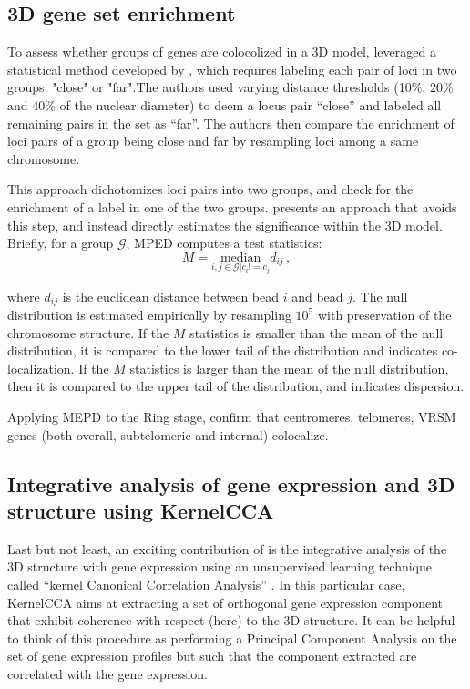\documentclass[2columns]{article}
\begin{document}
\subsection*{3D gene set enrichment}

To assess whether groups of genes are colocolized in a 3D model,
\citet{ay:three-dimensional} leveraged a statistical method developed by
\citet{witten:assessment}, which requires labeling each pair of loci in two
groups: "close" or "far".The authors used varying distance thresholds (10\%,
20\% and 40\% of the nuclear diameter) to deem a locus pair “close” and
labeled all remaining pairs in the set as “far”.  The authors then compare the
enrichment of loci pairs of a group being close and far by resampling loci
among a same chromosome.

This approach dichotomizes loci pairs into two groups, and check for the
enrichment of a label in one of the two groups. \citep{capurso:distance-based}
presents an approach that avoids this step, and instead directly estimates the
significance within the 3D model. Briefly, for a group $\mathcal{G}$, MPED
computes a test statistics:
\begin{equation*}
M = \underset{i,j \in \mathcal{G}| c_i != c_j}{\text{median}} d_{ij}\,,
\end{equation*}

where $d_{ij}$ is the euclidean distance between bead $i$ and bead $j$. The
null distribution is estimated empirically by resampling $10^5$ with
preservation of the chromosome structure. If the $M$ statistics is smaller
than the mean of the null distribution, it is compared to the lower tail of
the distribution and indicates co-localization. If the $M$ statistics is
larger than the mean of the null distribution, then it is compared to the
upper tail of the distribution, and indicates dispersion.

Applying MEPD to the Ring stage, \citet{capurso:distance-based} confirm that
centromeres, telomeres, VRSM genes (both overall, subtelomeric and internal)
colocalize.


\subsection*{Integrative analysis of gene expression and 3D structure using KernelCCA}

Last but not least, an exciting contribution of \citet{ay:three-dimensional}
is the integrative analysis of the 3D structure with gene expression using an
unsupervised learning technique called ``kernel Canonical Correlation
Analysis'' \citep{bach:kernel}. In this particular case,  KernelCCA aims at
extracting a set of orthogonal gene expression component that exhibit
coherence with respect (here) to the 3D structure. It can be helpful to
think of this procedure as performing a Principal Component Analysis on the
set of gene expression profiles but such that the component extracted are
correlated with the gene expression.
\end{document}
